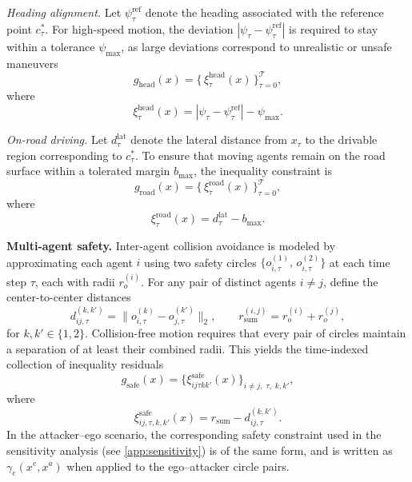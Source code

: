 \documentclass[10pt,twocolumn,letterpaper]{article}
\theoremstyle{plain}
\theoremstyle{remark}
\renewcommand{\paragraph}[1]{\vspace{.5em}\noindent\textbf{#1.}}
\begin{document}
\textit{Heading alignment.}
Let \(\psi_\tau^{\mathrm{ref}}\) denote the heading associated with
the reference point \(c_\tau^\ast\).
For high-speed motion, the deviation \(|\psi_\tau - \psi_\tau^{\mathrm{ref}}|\) is required to
stay within a tolerance \(\psi_{\max}\), as large deviations correspond to unrealistic or unsafe maneuvers
\[
g_{\mathrm{head}}(x)
=
\bigl\{\,\xi^{\mathrm{head}}_\tau(x)\,\bigr\}_{\tau=0}^{\mathcal{T}},
\]
where
\[
\xi^{\mathrm{head}}_\tau(x)
=
|\psi_\tau - \psi_\tau^{\mathrm{ref}}| - \psi_{\max}.
\]

\textit{On-road driving.}
Let \(d_\tau^{\mathrm{lat}}\) denote the lateral distance from
\(x_\tau\) to the drivable region corresponding to \(c_\tau^\ast\).
To ensure that moving agents remain on the road surface within a tolerated margin \(b_{\max}\), the inequality constraint is
\[
g_{\mathrm{road}}(x)
=
\bigl\{\,\xi^{\mathrm{road}}_\tau(x)\,\bigr\}_{\tau=0}^{\mathcal{T}},
\]
where
\[
\xi^{\mathrm{road}}_\tau(x)
=
d_\tau^{\mathrm{lat}} - b_{\max}.
\]

\paragraph{Multi-agent safety}
Inter-agent collision avoidance is modeled by approximating each
agent \(i\) using two safety circles 
\(\{o_{i,\tau}^{(1)},\, o_{i,\tau}^{(2)}\}\) at each time step \(\tau\),
each with radii \(r_o^{(i)}\).
For any pair of distinct agents \(i\neq j\), define the
center-to-center distances
\[
d_{ij,\tau}^{(k,k')}
=
\bigl\|o_{i,\tau}^{(k)} - o_{j,\tau}^{(k')}\bigr\|_2,
\qquad
r_{\mathrm{sum}}^{(i,j)} = r_o^{(i)} + r_o^{(j)},
\]
for \(k,k'\in\{1,2\}\).
Collision-free motion requires that every pair of circles maintain a separation of at least their combined radii.  
This yields the time-indexed collection of inequality residuals
\[
g_{\mathrm{safe}}(x)
=
\bigl\{
\xi^{\mathrm{safe}}_{ij\tau k k'}(x)
\bigr\}_{i\neq j,\;\tau,\;k,k'},
\]
where
\[
\xi^{\mathrm{safe}}_{ij,\tau,k,k'}(x)
=
r_{\mathrm{sum}} - d_{ij,\tau}^{(k,k')}.
\]
In the attacker–ego scenario, the corresponding safety constraint used in the sensitivity analysis (see \cref{app:sensitivity}) is of the same form, and is written as \(\gamma_e(x^e,x^a)\) when applied to the ego–attacker circle pairs.
\end{document}
